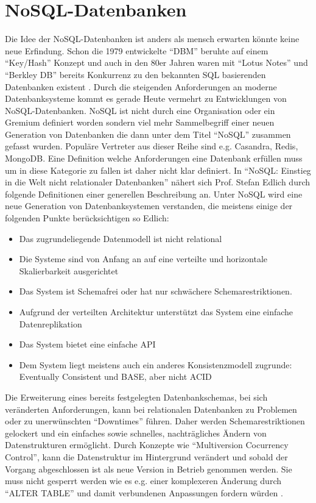 \documentclass[a4paper,11pt,oneside,%
headsepline,												%
footsepline,												%
bibtotocnumbered									%
]{scrreprt}
\begin{document}
\section{NoSQL-Datenbanken}
Die Idee der NoSQL-Datenbanken ist anders als mensch erwarten könnte keine neue Erfindung. Schon die 1979 entwickelte \enquote{DBM} beruhte auf einem \enquote{Key/Hash} Konzept und auch in den 80er Jahren waren mit \enquote{Lotus Notes} und \enquote{Berkley DB} bereits Konkurrenz zu den bekannten SQL basierenden Datenbanken existent \autocite[1]{Edlich2010}. Durch die steigenden Anforderungen an moderne Datenbanksysteme kommt es gerade Heute vermehrt zu Entwicklungen von NoSQL-Datenbanken. NoSQL ist nicht durch eine Organisation oder ein Gremium definiert worden sondern viel mehr Sammelbegriff einer neuen Generation von Datenbanken die dann unter dem Titel \enquote{NoSQL} zusammen gefasst wurden. Populäre Vertreter aus dieser Reihe sind e.g. Casandra, Redis, MongoDB. Eine Definition welche Anforderungen eine Datenbank erfüllen muss um in diese Kategorie zu fallen ist daher nicht klar definiert. In \enquote{NoSQL: Einstieg in die Welt nicht relationaler Datenbanken} nähert sich Prof. Stefan Edlich durch folgende Definitionen  einer generellen Beschreibung an. Unter NoSQL wird eine neue Generation von Datenbanksystemen verstanden, die meistens einige der folgenden Punkte berücksichtigen so Edlich\autocite[2]{Edlich2010}:
\begin{itemize}
		\item Das zugrundeliegende Datenmodell ist nicht relational
		\item Die Systeme sind von Anfang an auf eine verteilte und horizontale Skalierbarkeit ausgerichtet
		\item Das System ist Schemafrei oder hat nur schwächere Schemarestriktionen.
		\item Aufgrund der verteilten Architektur unterstützt das System eine einfache Datenreplikation
		\item Das System bietet eine einfache API
		\item Dem System liegt meistens auch ein anderes Konsistenzmodell zugrunde: Eventually Consistent und BASE, aber nicht ACID
\end{itemize}
Die Erweiterung eines bereits festgelegten Datenbankschemas, bei sich veränderten Anforderungen, kann bei relationalen Datenbanken zu Problemen oder zu unerwünschten \enquote{Downtimes} führen. Daher werden Schemarestriktionen gelockert und ein einfaches sowie schnelles, nachträgliches Ändern von Datenstrukturen ermöglicht. Durch Konzepte wie \enquote{Multiversion Cocurrency Control}, kann die Datenstruktur im Hintergrund verändert und sobald der Vorgang abgeschlossen ist als neue Version in Betrieb genommen werden. Sie muss nicht gesperrt werden wie es e.g. einer komplexeren Änderung durch \enquote{ALTER TABLE} und damit verbundenen Anpassungen fordern würden \autocite[3, 40]{Edlich2010}.\\
\end{document}
